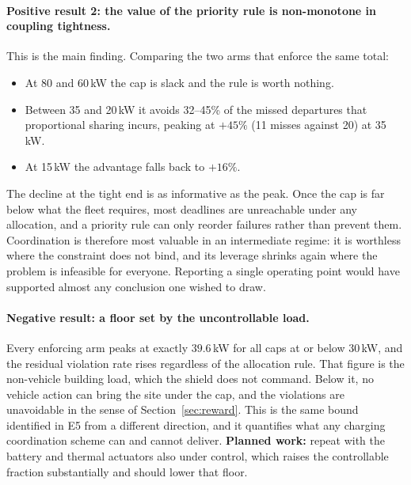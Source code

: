 \documentclass[11pt]{article}
\begin{document}
\paragraph{Positive result 2: the value of the priority rule is non-monotone in
coupling tightness.} This is the main finding. Comparing the two arms that
enforce the same total:

\begin{itemize}[nosep]
\item At 80 and 60\,kW the cap is slack and the rule is worth nothing.
\item Between 35 and 20\,kW it avoids 32--45\% of the missed departures that
proportional sharing incurs, peaking at $+45\%$ (11 misses against 20) at
35\,kW.
\item At 15\,kW the advantage falls back to $+16\%$.
\end{itemize}

The decline at the tight end is as informative as the peak. Once the cap is far
below what the fleet requires, most deadlines are unreachable under any
allocation, and a priority rule can only reorder failures rather than prevent
them. Coordination is therefore most valuable in an intermediate regime: it is
worthless where the constraint does not bind, and its leverage shrinks again
where the problem is infeasible for everyone. Reporting a single operating point
would have supported almost any conclusion one wished to draw.

\paragraph{Negative result: a floor set by the uncontrollable load.} Every
enforcing arm peaks at exactly $39.6$\,kW for all caps at or below 30\,kW, and
the residual violation rate rises regardless of the allocation rule. That figure
is the non-vehicle building load, which the shield does not command. Below it, no
vehicle action can bring the site under the cap, and the violations are
unavoidable in the sense of Section~\ref{sec:reward}. This is the same bound
identified in E5 from a different direction, and it quantifies what any charging
coordination scheme can and cannot deliver. \textbf{Planned work:} repeat with
the battery and thermal actuators also under control, which raises the
controllable fraction substantially and should lower that floor.
\end{document}
